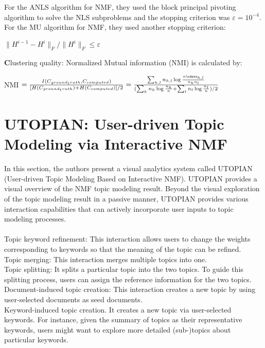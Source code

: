 \documentclass[11pt, oneside]{article}   	%
\begin{document}
\begin{Large}
For the ANLS algorithm for NMF, they used the block principal pivoting algorithm to solve the NLS subproblems and the stopping criterion was $\varepsilon = 10^{-4}$. For the MU algorithm for NMF, they used another stopping criterion:
\begin{center}
$\|H^{i-1}-H^{i}\|_{F}/\|H^{i}\|_{F}\leq\varepsilon$
\end{center}

\textbf Clustering quality: Normalized Mutual information (NMI) is calculated by:
\begin{center}
NMI $= \frac{I(C_{ground_truth},C_{computed})}{[H(C_{ground_truth})+H(C_{computed})]/2}=\frac{\sum_{h,l} n_{h,l}\log \frac{n\cdotn_{h,l}}{n_{h}n_{l}}}{(\sum_{h} n_{h}\log \frac{n_{h}}{n}+\sum_{l} n_{l}\log \frac{n_{l}}{n})/2}$
\end{center}

\section{UTOPIAN: User-driven Topic Modeling via Interactive NMF}

In this section, the authors present a visual analytics system called UTOPIAN (User-driven Topic Modeling Based on Interactive NMF). UTOPIAN provides a visual overview of the NMF topic modeling result. Beyond the visual exploration of the topic modeling result in a passive manner, UTOPIAN provides various interaction capabilities that can actively incorporate user inputs to topic modeling processes.\\\\
Topic keyword refinement: This interaction allows users to change the weights corresponding to keywords so that the meaning of the topic can be refined.\\
Topic merging: This interaction merges multiple topics into one.\\
Topic splitting: It splits a particular topic into the two topics. To guide this splitting process, users can assign the reference information for the two topics.\\
Document-induced topic creation: This interaction creates a new topic by using user-selected documents as seed documents.\\
Keyword-induced topic creation. It creates a new topic via user-selected keywords. For instance, given the summary of topics as their representative keywords, users might want to explore more detailed (sub-)topics about particular keywords.


\end{Large}
\end{document}
